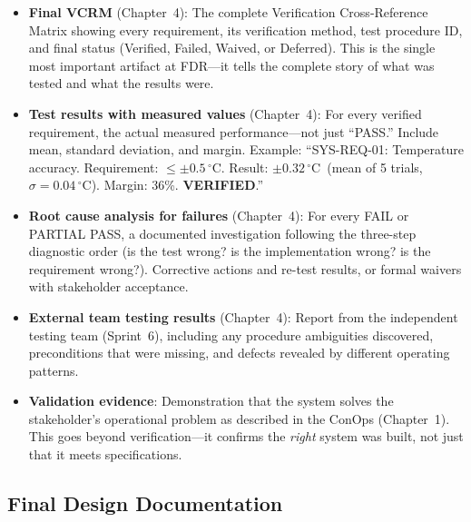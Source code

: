 \documentclass[11pt,letterpaper,twoside,openany]{book}
\newcommand{\degC}{\ensuremath{{}^{\circ}\text{C}}}
\begin{document}
\begin{itemize}[leftmargin=1.5em]
\item \textbf{Final VCRM} (Chapter~4): The complete Verification Cross-Reference Matrix showing every requirement, its verification method, test procedure ID, and final status (Verified, Failed, Waived, or Deferred). This is the single most important artifact at FDR---it tells the complete story of what was tested and what the results were.
\item \textbf{Test results with measured values} (Chapter~4): For every verified requirement, the actual measured performance---not just ``PASS.'' Include mean, standard deviation, and margin. Example: ``SYS-REQ-01: Temperature accuracy. Requirement: $\leq \pm 0.5$\,\degC. Result: $\pm 0.32$\,\degC\ (mean of 5 trials, $\sigma = 0.04$\,\degC). Margin: 36\%. \textbf{VERIFIED}.''
\item \textbf{Root cause analysis for failures} (Chapter~4): For every FAIL or PARTIAL PASS, a documented investigation following the three-step diagnostic order (is the test wrong? is the implementation wrong? is the requirement wrong?). Corrective actions and re-test results, or formal waivers with stakeholder acceptance.
\item \textbf{External team testing results} (Chapter~4): Report from the independent testing team (Sprint~6), including any procedure ambiguities discovered, preconditions that were missing, and defects revealed by different operating patterns.
\item \textbf{Validation evidence}: Demonstration that the system solves the stakeholder's operational problem as described in the ConOps (Chapter~1). This goes beyond verification---it confirms the \emph{right} system was built, not just that it meets specifications.
\end{itemize}

\subsection{Final Design Documentation}
\end{document}
